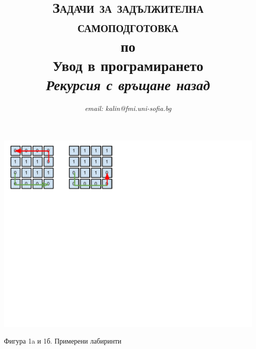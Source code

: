 \documentclass[12pt,a4paper]{article}
\author{\textit{email: kalin@fmi.uni-sofia.bg}}
\title{\textsc{Задачи за задължителна самоподготовка} \\
по \\
Увод в програмирането\\
\textit{Рекурсия с връщане назад}}
\begin{document}
\maketitle

\begin{flushleft}
\includegraphics[width=15cm]{images/path1}

\vspace{-200px}

Фигура 1a и 1б. Примерени лабиринти
\end{flushleft}
\end{document}
